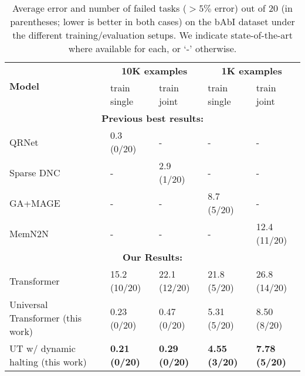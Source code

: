 \begin{table}[t!]
\centering
\begin{adjustbox}{max width=\textwidth}
\begin{tabular}{lllll}
& & & & \\ \toprule
\multirow{2}{*}{ \bf Model } & \multicolumn{2}{c}{ \bf 10K examples } & \multicolumn{2}{c}{ \bf 1K examples } \\ \cmidrule{2-5}
& train single & train joint & train single & train joint \\ \midrule
\multicolumn{5}{c}{\bf Previous best results:} \\ \midrule
QRNet~\citep{seo2016query} & 0.3 (0/20) & - & - & - \\
Sparse DNC~\citep{rae2016scaling} & - & 2.9 (1/20) & - & - \\
GA+MAGE~\cite{dhingra2017linguistic} & - & - & 8.7 (5/20) & - \\
MemN2N~\cite{sukhbaatar2015} & - & - & -  & 12.4 (11/20) \\\midrule
\multicolumn{5}{c}{\bf Our Results:} \\ \midrule
Transformer~\citep{transformer} & 15.2 (10/20) & 22.1 (12/20) & 21.8 (5/20) & 26.8 (14/20) \\
Universal Transformer (this work) & 0.23 (0/20) & 0.47 (0/20) & 5.31 (5/20) & 8.50 (8/20) \\
UT w/ dynamic halting (this work) & {\bf 0.21 (0/20)} & {\bf 0.29 (0/20)} & {\bf 4.55 (3/20)} & {\bf 7.78 (5/20)} \\ \bottomrule
\end{tabular}
\end{adjustbox}
\caption{Average error and number of failed tasks ($> 5\%$ error) out of 20 (in parentheses; lower is better in both cases) on the bAbI dataset under the different training/evaluation setups. We indicate state-of-the-art where available for each, or `-' otherwise.}
\label{tab:babi-results}
\end{table}